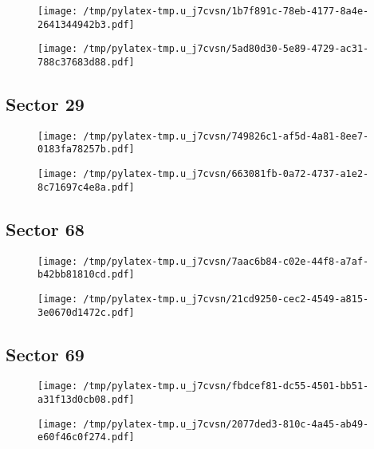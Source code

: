 \documentclass{report}%
\begin{document}
\begin{figure}[H]%
\centering%
\centering%
\texttt{[image: /tmp/pylatex-tmp.u\_j7cvsn/1b7f891c-78eb-4177-8a4e-2641344942b3.pdf]}%
\end{figure}

%


\begin{figure}[H]%
\centering%
\texttt{[image: /tmp/pylatex-tmp.u\_j7cvsn/5ad80d30-5e89-4729-ac31-788c37683d88.pdf]}%
\end{figure}

%
\subsection{Sector 29}%
\label{subsec:42593364429}%


\begin{figure}[H]%
\centering%
\centering%
\texttt{[image: /tmp/pylatex-tmp.u\_j7cvsn/749826c1-af5d-4a81-8ee7-0183fa78257b.pdf]}%
\end{figure}

%


\begin{figure}[H]%
\centering%
\texttt{[image: /tmp/pylatex-tmp.u\_j7cvsn/663081fb-0a72-4737-a1e2-8c71697c4e8a.pdf]}%
\end{figure}

%
\subsection{Sector 68}%
\label{subsec:42593364468}%


\begin{figure}[H]%
\centering%
\centering%
\texttt{[image: /tmp/pylatex-tmp.u\_j7cvsn/7aac6b84-c02e-44f8-a7af-b42bb81810cd.pdf]}%
\end{figure}

%


\begin{figure}[H]%
\centering%
\texttt{[image: /tmp/pylatex-tmp.u\_j7cvsn/21cd9250-cec2-4549-a815-3e0670d1472c.pdf]}%
\end{figure}

%
\subsection{Sector 69}%
\label{subsec:42593364469}%


\begin{figure}[H]%
\centering%
\centering%
\texttt{[image: /tmp/pylatex-tmp.u\_j7cvsn/fbdcef81-dc55-4501-bb51-a31f13d0cb08.pdf]}%
\end{figure}

%


\begin{figure}[H]%
\centering%
\texttt{[image: /tmp/pylatex-tmp.u\_j7cvsn/2077ded3-810c-4a45-ab49-e60f46c0f274.pdf]}%
\end{figure}

%
\end{document}
